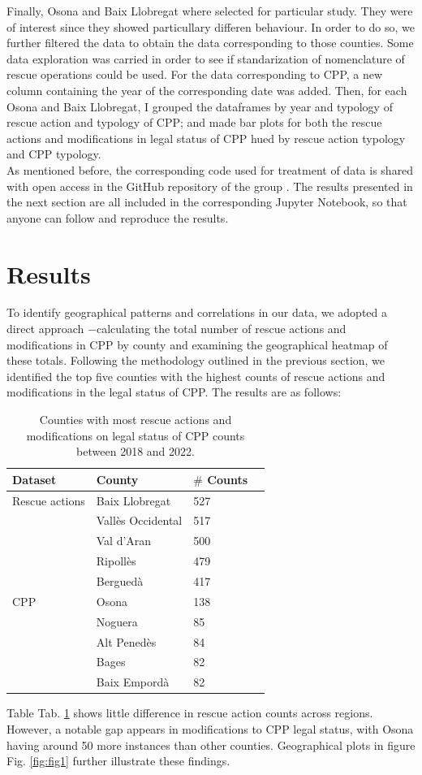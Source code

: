 \documentclass[
  journal=small,
  manuscript=mini-article,  %
  year=2023,
  volume=1,
]{odj-journal}
\begin{document}
Finally, Osona and Baix Llobregat where selected for particular study. They were of interest since they showed particullary differen behaviour. In order to do so, we further filtered the data to obtain the data corresponding to those counties. Some data exploration was carried in order to see if standarization of nomenclature of rescue operations could be used. For the data corresponding to CPP, a new column containing the year of the corresponding date was added. Then, for each Osona and Baix Llobregat, I grouped the dataframes by year and typology of rescue action and typology of CPP; and made bar plots for both the rescue actions and modifications in legal status of CPP hued by rescue action typology and CPP typology.\\

As mentioned before, the corresponding code used for treatment of data is shared with open access in the GitHub repository of the group \cite{github_repo}. The results presented in the next section are all included in the corresponding Jupyter Notebook, so that anyone can follow and reproduce the results.

\section{Results}\label{sec:res}
To identify geographical patterns and correlations in our data, we adopted a direct approach $-$calculating the total number of rescue actions and modifications in CPP by county and examining the geographical heatmap of these totals. Following the methodology outlined in the previous section, we identified the top five counties with the highest counts of rescue actions and modifications in the legal status of CPP. The results are as follows:


\begin{longtable}{p{2.5cm}p{2.5cm}p{2.5cm}p{2.5cm}}
  \caption{Counties with most rescue actions and modifications on legal status of CPP counts between 2018 and 2022.}\label{tab:tab1}\\
  \toprule
  \textbf{Dataset} & \textbf{County} & \textbf{$\#$ Counts} \\
  \midrule
  \endhead
  \midrule
  \endfoot
  Rescue actions & Baix Llobregat & 527 \\
   & Vallès Occidental & 517 \\
   & Val d'Aran & 500 \\
   & Ripollès & 479 \\
   & Berguedà & 417 \\
  \midrule
  CPP & Osona & 138 \\
   & Noguera & 85 \\
   & Alt Penedès & 84 \\
   & Bages & 82 \\
   & Baix Empordà & 82 \\
  \bottomrule
\end{longtable}
Table Tab. \ref{tab:tab1} shows little difference in rescue action counts across regions. However, a notable gap appears in modifications to CPP legal status, with Osona having around 50 more instances than other counties. Geographical plots in figure Fig. \ref{fig:fig1} further illustrate these findings.
\end{document}

